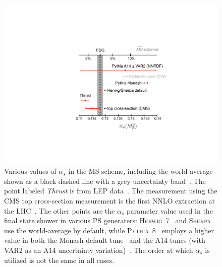 \documentclass[11pt]{cernrep}
\begin{document}
\begin{figure}[t]
\begin{center}
\includegraphics[width = 0.5\columnwidth]{jetsub_alphas_alphas_propaganda.pdf}
\end{center}
\caption{Various values of $\alpha_s$ in the $\overline{\mathrm{MS}}$ scheme, including the world-average shown as a black dashed line with a grey uncertainty band~\cite{Olive:2016xmw}.
%
The point labeled \textit{Thrust} is from LEP data~\cite{Abbate:2010xh,Hoang:2015hka,Heister:2003aj,Abdallah:2004xe,Abreu:1996mk,Abreu:1999rc,Biebel:1999zt,Adeva:1992gv,Abbiendi:2004qz,Abe:1994mf}.
%
The measurement using the CMS top cross-section measurement is the first NNLO extraction at the LHC~\cite{Chatrchyan:2013haa}.
%
The other points are the $\alpha_s$ parameter value used in the final state shower in various PS generaters: \textsc{Herwig~7}~\cite{Bellm:2015jjp} and \textsc{Sherpa}~\cite{Gleisberg:2008ta} use the world-average by default, while \textsc{Pythia~8}~\cite{Sjostrand:2006za,Sjostrand:2014zea} employs a higher value in both the Monash default tune~\cite{Skands:2014pea} and the A14 tunes (with VAR2 as an A14 uncertainty variation)~\cite{ATL-PHYS-PUB-2014-021}.
%
The order at which $\alpha_s$ is utilized is not the same in all cases.}
\label{jetsub_alphas_jetsub_alphas_fig:propaganda}
\end{figure}
\end{document}

